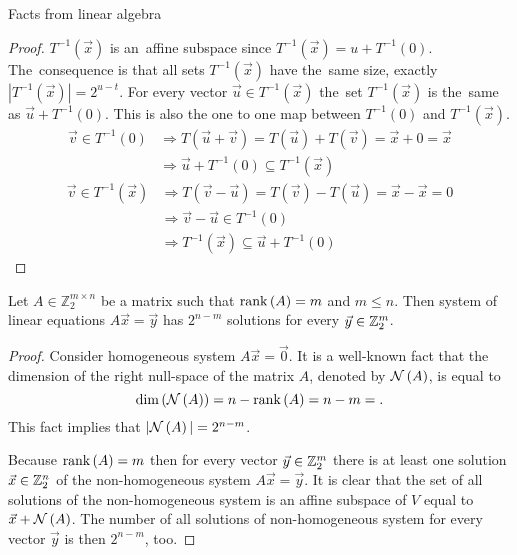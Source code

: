 \begin{chapter}{Facts from linear algebra}
\begin{proof}
$T^{-1}(\vec{x})$ is an~affine subspace since $T^{-1}(\vec{x}) = u + T^{-1}(0)$. The~consequence is that all sets $T^{-1}(\vec{x})$ have the~same size, exactly $|T^{-1}(\vec{x})| = 2^{u-t}$. For every vector $\vec{u} \in T^{-1}(\vec{x})$ the~set $T^{-1}(\vec{x})$ is the~same as $\vec{u} + T^{-1}(0)$. This is also the one to one map between $T^{-1}(0)$ and $T^{-1}(\vec{x})$.
\begin{displaymath}
\begin{split}
\vec{v} \in T^{-1}(0) 
	& \Rightarrow T(\vec{u} + \vec{v}) = T(\vec{u}) + T(\vec{v}) = \vec{x} + 0 = \vec{x}  \\
	& \Rightarrow \vec{u} + T^{-1}(0) \subseteq T^{-1}(\vec{x})
\end{split}
\end{displaymath}
\begin{displaymath}
\begin{split}
\vec{v} \in T^{-1}(\vec{x}) 
	& \Rightarrow T(\vec{v} - \vec{u}) = T(\vec{v}) - T(\vec{u}) = \vec{x} - \vec{x} = 0 \\
	& \Rightarrow \vec{v} - \vec{u} \in T^{-1}(0) \\
	& \Rightarrow T^{-1}(\vec{x}) \subseteq \vec{u} + T^{-1}(0)
\end{split}
\end{displaymath}
\end{proof}

\begin{lemma}
\label{lemma-system-of-linear-equations-solution-count}
Let $A \in \mathbb{Z}_2^{m \times n}$ be a matrix such that $\mathrm{rank}\left({A}\right) = m$ and $m \leq n$. Then system of linear equations $A\vec{x} = \vec{y}$ has $2 ^ {n - m}$ solutions for every $\vec{y} \in \mathbb{Z}_{2}^{m}$.
\end{lemma}
\begin{proof}
Consider homogeneous system $A\vec{x} = \vec{0}$. It is a well-known fact that the dimension of the right null-space of the matrix $A$, denoted by $\mathcal{N}\left({A}\right)$, is equal to \[ \mathrm{dim}\left({\mathcal{N}\left({A}\right)}\right) =n - \mathrm{rank}\left({A}\right) = n - m = \text{.} \] This fact implies that $|\mathcal{N}\left({A}\right)| = 2 ^ {n - m}$.

Because $\mathrm{rank}\left({A}\right) = m$ then for every vector $\vec{y} \in \mathbb{Z}_{2}^{m}$ there is at least one solution $\vec{x} \in \mathbb{Z}_{2}^{n}$ of the non-homogeneous system $A\vec{x} = \vec{y}$. It is clear that the set of all solutions of the non-homogeneous system is an affine subspace of $V$ equal to $\vec{x} + \mathcal{N}\left({A}\right)$. The number of all solutions of non-homogeneous system for every vector $\vec{y}$ is then $2 ^ {n - m}$, too.
\end{proof}
\end{chapter}
